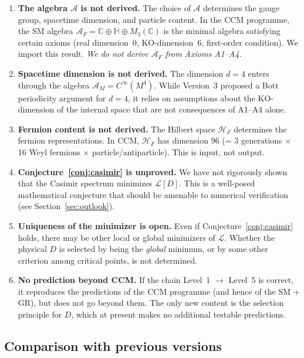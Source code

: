 \documentclass[12pt]{article}
\theoremstyle{definition}
\theoremstyle{remark}
\begin{document}
\begin{enumerate}
\item \textbf{The algebra $\mathcal{A}$ is not derived.}
  The choice of $\mathcal{A}$ determines the gauge group, spacetime
  dimension, and particle content.  In the CCM programme, the SM algebra
  $\mathcal{A}_F = \mathbb{C} \oplus \mathbb{H} \oplus M_3(\mathbb{C})$
  is the minimal algebra satisfying certain axioms (real dimension~0,
  KO-dimension~6, first-order condition).  We import this result.
  \emph{We do not derive $\mathcal{A}_F$ from Axioms A1--A4.}

\item \textbf{Spacetime dimension is not derived.}
  The dimension $d=4$ enters through the algebra
  $\mathcal{A}_M = C^\infty(M^4)$.  While Version~3
  \cite{Olbryk2026v3} proposed a Bott periodicity argument
  for $d=4$, it relies on assumptions about the KO-dimension
  of the internal space that are not consequences of A1--A4 alone.

\item \textbf{Fermion content is not derived.}
  The Hilbert space $\mathcal{H}_F$ determines the fermion
  representations.  In CCM, $\mathcal{H}_F$ has dimension 96
  (= 3 generations $\times$ 16 Weyl fermions $\times$ particle/antiparticle).
  This is input, not output.

\item \textbf{Conjecture~\ref{conj:casimir} is unproved.}
  We have not rigorously shown that the Casimir spectrum minimizes
  $\mathcal{L}[D]$.  This is a well-posed mathematical conjecture
  that should be amenable to numerical verification (see
  Section~\ref{sec:outlook}).

\item \textbf{Uniqueness of the minimizer is open.}
  Even if Conjecture~\ref{conj:casimir} holds, there may be other
  local or global minimizers of $\mathcal{L}$.  Whether the physical
  $D$ is selected by being the \emph{global} minimum, or by some
  other criterion among critical points, is not determined.

\item \textbf{No prediction beyond CCM.}
  If the chain Level~1 $\to$ Level~5 is correct, it reproduces
  the predictions of the CCM programme (and hence of the SM + GR),
  but does not go beyond them.  The only new content is the
  selection principle for $D$, which at present makes no
  additional testable predictions.
\end{enumerate}

\subsection{Comparison with previous versions}
\end{document}
